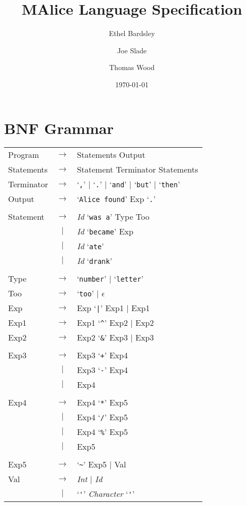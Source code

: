 \documentclass[a4wide, 11pt]{article}
\begin{document}
\title{MAlice Language Specification}

\author{Ethel Bardsley \and Joe Slade \and Thomas Wood}

\date{\today}         %

\maketitle            %

\section{BNF Grammar} 
\begin{tabular}{lcl}
Program     & $\to$ & Statements Output \\
Statements  & $\to$ & Statement Terminator Statements \\
Terminator  & $\to$ & `\verb:,:' $|$ `\verb:.:' $|$ `\verb:and:' $|$ `\verb:but:' $|$ `\verb:then:' \\
Output      & $\to$ & `\verb:Alice found:' Exp `\verb:.:' \\
\\
Statement   & $\to$ & \emph{Id} `\verb|was a|' Type Too \\
            &  $|$  & \emph{Id} `\verb|became|' Exp \\
            &  $|$  & \emph{Id} `\verb|ate|' \\
            &  $|$  & \emph{Id} `\verb|drank|' \\
\\
Type        & $\to$ & `\verb|number|' $|$ `\verb|letter|' \\
Too         & $\to$ & `\verb|too|' $|$ $\epsilon$ \\
Exp         & $\to$ & Exp `\verb:|:' Exp1 $|$ Exp1 \\
Exp1        & $\to$ & Exp1 `\verb:^:' Exp2 $|$ Exp2 \\
Exp2        & $\to$ & Exp2 `\verb:&:' Exp3 $|$ Exp3 \\
\\
Exp3        & $\to$ & Exp3 `\verb:+:' Exp4 \\
            &  $|$  & Exp3 `\verb:-:' Exp4 \\
            &  $|$  & Exp4 \\
\\
Exp4        & $\to$ & Exp4 `\verb:*:' Exp5 \\
            &  $|$  & Exp4 `\verb:/:' Exp5 \\
            &  $|$  & Exp4 `\verb:%:' Exp5 \\
            &  $|$  & Exp5 \\
\\
Exp5        & $\to$ & `\verb:~:' Exp5 $|$ Val \\
Val         & $\to$ & \emph{Int} $|$ \emph{Id} \\
            & $|$   & `\verb|'|' \emph{Character} `\verb|'|'
\end{tabular}
\end{document}
